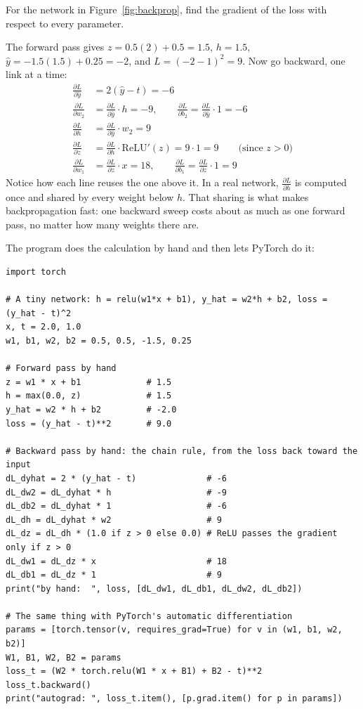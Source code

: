 \begin{Worked}
\begin{Problem}
For the network in Figure~\ref{fig:backprop}, find the gradient of the loss with respect to every
parameter.
\end{Problem}
\begin{Solution}
The forward pass gives $z = 0.5(2) + 0.5 = 1.5$, $h = 1.5$, $\hat{y} = -1.5(1.5) + 0.25 = -2$, and
$L = (-2 - 1)^2 = 9$. Now go backward, one link at a time:
\begin{align*}
\frac{\partial L}{\partial \hat{y}} &= 2(\hat{y} - t) = -6 \\
\frac{\partial L}{\partial w_2} &= \frac{\partial L}{\partial \hat{y}} \cdot h = -9, \qquad
\frac{\partial L}{\partial b_2} = \frac{\partial L}{\partial \hat{y}} \cdot 1 = -6 \\
\frac{\partial L}{\partial h} &= \frac{\partial L}{\partial \hat{y}} \cdot w_2 = 9 \\
\frac{\partial L}{\partial z} &= \frac{\partial L}{\partial h} \cdot \mathrm{ReLU}'(z) = 9 \cdot 1 = 9
\qquad \text{(since } z > 0\text{)} \\
\frac{\partial L}{\partial w_1} &= \frac{\partial L}{\partial z} \cdot x = 18, \qquad
\frac{\partial L}{\partial b_1} = \frac{\partial L}{\partial z} \cdot 1 = 9
\end{align*}
Notice how each line reuses the one above it. In a real network, $\frac{\partial L}{\partial h}$ is computed once
and shared by every weight below $h$. That sharing is what makes backpropagation fast: one backward sweep costs
about as much as one forward pass, no matter how many weights there are.
\end{Solution}
\end{Worked}

The program  does the calculation by hand and then lets PyTorch do it:

\begin{verbatim}
import torch

# A tiny network: h = relu(w1*x + b1), y_hat = w2*h + b2, loss = (y_hat - t)^2
x, t = 2.0, 1.0
w1, b1, w2, b2 = 0.5, 0.5, -1.5, 0.25

# Forward pass by hand
z = w1 * x + b1             # 1.5
h = max(0.0, z)             # 1.5
y_hat = w2 * h + b2         # -2.0
loss = (y_hat - t)**2       # 9.0

# Backward pass by hand: the chain rule, from the loss back toward the input
dL_dyhat = 2 * (y_hat - t)              # -6
dL_dw2 = dL_dyhat * h                   # -9
dL_db2 = dL_dyhat * 1                   # -6
dL_dh = dL_dyhat * w2                   # 9
dL_dz = dL_dh * (1.0 if z > 0 else 0.0) # ReLU passes the gradient only if z > 0
dL_dw1 = dL_dz * x                      # 18
dL_db1 = dL_dz * 1                      # 9
print("by hand:  ", loss, [dL_dw1, dL_db1, dL_dw2, dL_db2])

# The same thing with PyTorch's automatic differentiation
params = [torch.tensor(v, requires_grad=True) for v in (w1, b1, w2, b2)]
W1, B1, W2, B2 = params
loss_t = (W2 * torch.relu(W1 * x + B1) + B2 - t)**2
loss_t.backward()
print("autograd: ", loss_t.item(), [p.grad.item() for p in params])
\end{verbatim}

